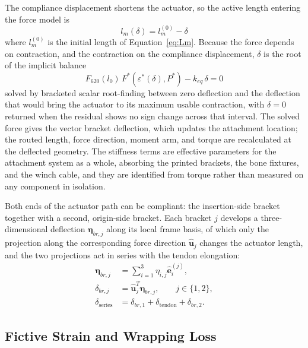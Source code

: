 The compliance displacement shortens the actuator, so the active length entering the force model is
\begin{equation} l_m(\delta) = l_m^{(0)} - \delta
\label{eq:activelengthcorrected}
\end{equation}
where $l_m^{(0)}$ is the initial length of Equation~\eqref{eq:Lm}. Because the force depends on contraction, and the contraction on the compliance displacement, $\delta$ is the root of the implicit balance
\begin{equation} F_{620}(l_{0}) \, F^{*}\!\left(\varepsilon^*(\delta),P^*\right) - k_{eq}\,\delta = 0
\label{eq:complianceforcebalance}
\end{equation}
solved by bracketed scalar root-finding between zero deflection and the deflection that would bring the actuator to its maximum usable contraction, with $\delta = 0$ returned when the residual shows no sign change across that interval. The solved force gives the vector bracket deflection, which updates the attachment location; the routed length, force direction, moment arm, and torque are recalculated at the deflected geometry. The stiffness terms are effective parameters for the attachment system as a whole, absorbing the printed brackets, the bone fixtures, and the winch cable, and they are identified from torque rather than measured on any component in isolation.

Both ends of the actuator path can be compliant: the insertion-side bracket together with a second, origin-side bracket. Each bracket $j$ develops a three-dimensional deflection $\boldsymbol{\eta}_{br,j}$ along its local frame basis, of which only the projection along the corresponding force direction $\hat{\mathbf{u}}_j$ changes the actuator length, and the two projections act in series with the tendon elongation:
\begin{equation}
\begin{aligned}
\boldsymbol{\eta}_{br,j} &= \sum_{i=1}^{3}\eta_{i,j}\hat{\mathbf{e}}_i^{(j)},\\
\delta_{br,j} &= \hat{\mathbf{u}}_j^T\boldsymbol{\eta}_{br,j}, \qquad j\in\{1,2\},\\
\delta_{\mathrm{series}} &= \delta_{br,1}+\delta_{\mathrm{tendon}}+\delta_{br,2}.
\end{aligned}
\label{eq:bracket_series_projection}
\end{equation}

\subsection{Fictive Strain and Wrapping Loss}\label{sec:fictive_contraction}

